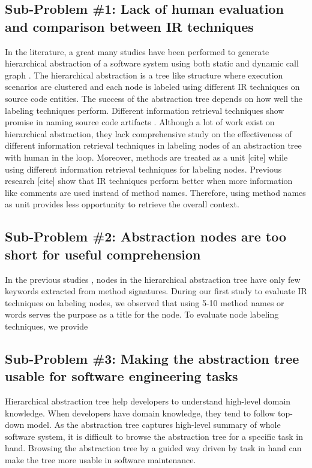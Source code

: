     \subsection{Sub-Problem \#1: Lack of human evaluation and comparison between IR techniques} In the literature, a great many studies have been performed to generate hierarchical abstraction of a software system using both static and dynamic call graph \cite{feng2018hierarchicalExecutionComprehension, gharibi2018automaticStaticCluster, xin2019identifyingFeaturesExecution}. The hierarchical abstraction is a tree like structure where execution scenarios are clustered and each node is labeled using different IR techniques on source code entities. The success of the abstraction tree depends on how well the labeling techniques perform. Different information retrieval techniques show promise in naming source code artifacts \cite{chen2016topicMiningRepositories, panichella2013topicModelsTasks, sun2016surveyTopicSE}. Although a lot of work exist on hierarchical abstraction, they lack comprehensive study on the effectiveness of different information retrieval techniques in labeling nodes of an abstraction tree with human in the loop. Moreover, methods are treated as a unit [cite] while using different information retrieval techniques for labeling nodes. Previous research [cite] show that IR techniques perform better when more information like comments are used instead of method names. Therefore, using method names as unit provides less opportunity to retrieve the overall context.
    

    \subsection{Sub-Problem \#2: Abstraction nodes are too short for useful comprehension}
    In the previous studies \cite{feng2018hierarchicalExecutionComprehension, gharibi2018automaticStaticCluster}, nodes in the hierarchical abstraction tree have only few keywords extracted from method signatures. During our first study to evaluate IR techniques on labeling nodes, we observed that using 5-10 method names or words serves the purpose as a title for the node.
    To evaluate node labeling techniques, we provide  
    
   

    \subsection{Sub-Problem \#3: Making the abstraction tree usable for software engineering tasks} Hierarchical abstraction tree help developers to understand high-level domain knowledge. When developers have domain knowledge, they tend to follow top-down model. As the abstraction tree captures high-level summary of whole software system, it is difficult to browse the abstraction tree for a specific task in hand. Browsing the abstraction tree by a guided way driven by task in hand can make the tree more usable in software maintenance. 
    
